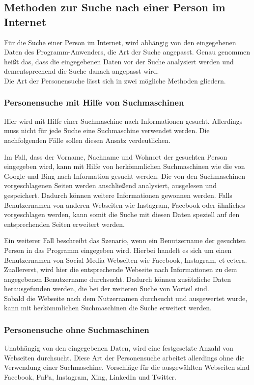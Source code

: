 \subsection{Methoden zur Suche nach einer Person im Internet}
\label{sec:Suche nach Information}
Für die Suche einer Person im Internet, wird abhängig von den eingegebenen Daten des Programm-Anwenders, die Art der Suche angepasst. Genau genommen heißt das, dass die eingegebenen Daten vor der Suche analysiert werden und dementsprechend die Suche danach angepasst wird. \\
Die Art der Personensuche lässt sich in zwei mögliche Methoden gliedern.
\subsubsection{Personensuche mit Hilfe von Suchmaschinen}
\label{subsubsec:PersonensucheMitHilfevonSuchmaschine}
Hier wird mit Hilfe einer Suchmaschine nach Informationen gesucht. Allerdings muss nicht für jede Suche eine Suchmaschine verwendet werden. Die nachfolgenden Fälle sollen diesen Ansatz verdeutlichen.

Im Fall, dass der Vorname, Nachname und Wohnort der gesuchten Person eingegeben wird, kann mit Hilfe von herkömmlichen Suchmaschinen wie die von Google und Bing nach Information gesucht werden. Die von den Suchmaschinen vorgeschlagenen Seiten werden anschließend analysiert, ausgelesen und gespeichert. Dadurch können weitere Informationen gewonnen werden. Falls Benutzernamen von anderen Webseiten wie Instagram, Facebook oder ähnliches vorgeschlagen werden, kann somit die Suche mit diesen Daten speziell auf den entsprechenden Seiten erweitert werden.

Ein weiterer Fall beschreibt das Szenario, wenn ein Benutzername der gesuchten Person in das Programm eingegeben wird. Hierbei handelt es sich um einen Benutzernamen von Social-Media-Webseiten wie Facebook, Instagram, et cetera. \\
Zuallererst, wird hier die entsprechende Webseite nach Informationen zu dem angegebenen Benutzername durchsucht. Dadurch können zusätzliche Daten herausgefunden werden, die bei der weiteren Suche von Vorteil sind.\\
Sobald die Webseite nach dem Nutzernamen durchsucht und ausgewertet wurde, kann mit herkömmlichen Suchmaschinen die Suche erweitert werden.

\subsubsection{Personensuche ohne Suchmaschinen}
\label{subsubsec:PersonensucheohneSuchmaschine}
Unabhängig von den eingegebenen Daten, wird eine festgesetzte Anzahl von Webseiten durchsucht. Diese Art der Personensuche arbeitet allerdings ohne die Verwendung einer Suchmaschine. Vorschläge für die ausgewählten Webseiten sind Facebook, FuPa, Instagram, Xing, LinkedIn und Twitter.


